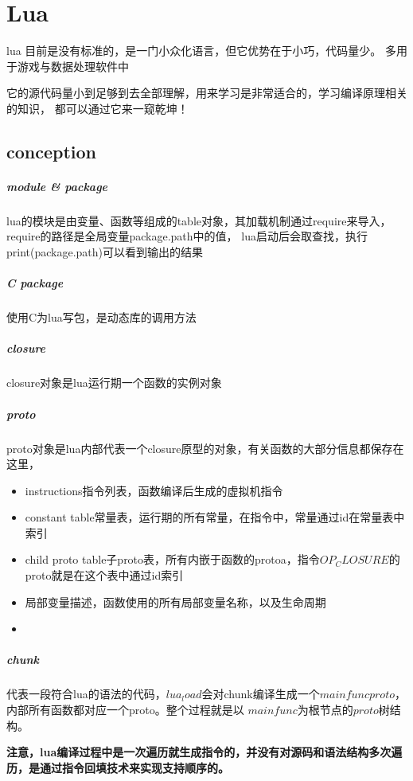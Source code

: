 \chapter{Lua}

lua\cite{luaorg} 目前是没有标准的，是一门小众化语言，但它优势在于小巧，代码量少。
多用于游戏与数据处理软件中

它的源代码量小到足够到去全部理解，用来学习是非常适合的，学习编译原理相关的知识，
都可以通过它来一窥乾坤！

\section{conception}

\paragraph{module \& package}
lua的模块是由变量、函数等组成的table对象，其加载机制通过require来导入，require的路径是全局变量package.path中的值，
lua启动后会取查找，执行print(package.path)可以看到输出的结果

\paragraph{C package}
使用C为lua写包，是动态库的调用方法

\paragraph{closure}
closure对象是lua运行期一个函数的实例对象

\paragraph{proto}
proto对象是lua内部代表一个closure原型的对象，有关函数的大部分信息都保存在这里，

\begin{itemize}
    \item {instructions指令列表，函数编译后生成的虚拟机指令}
    \item {constant table常量表，运行期的所有常量，在指令中，常量通过id在常量表中索引}
    \item {child proto table子proto表，所有内嵌于函数的protoa，指令$OP_CLOSURE$的proto就是在这个表中通过id索引}
    \item {局部变量描述，函数使用的所有局部变量名称，以及生命周期}
    \item {}
\end{itemize}

\paragraph{chunk}
代表一段符合lua的语法的代码，$lua_load$会对chunk编译生成一个$mainfunc proto$，内部所有函数都对应一个proto。整个过程就是以
$mainfunc$为根节点的$proto$树结构。

\textbf{注意，lua编译过程中是一次遍历就生成指令的，并没有对源码和语法结构多次遍历，是通过指令回填技术来实现支持顺序的。}



